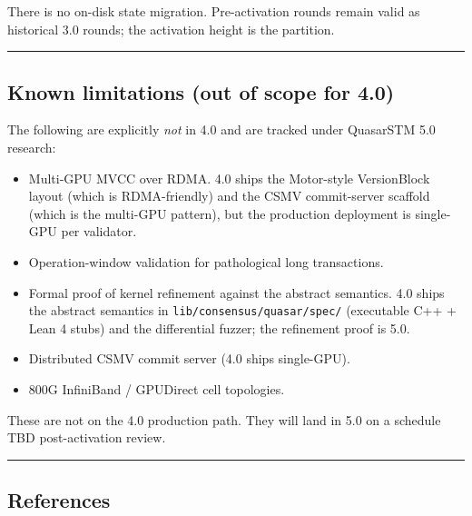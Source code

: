 \documentclass[
]{article}
\providecommand{\tightlist}{%
  \setlength{\itemsep}{0pt}\setlength{\parskip}{0pt}}
\begin{document}
There is no on-disk state migration. Pre-activation rounds remain valid
as historical 3.0 rounds; the activation height is the partition.

\begin{center}\rule{0.5\linewidth}{0.5pt}\end{center}

\subsection{Known limitations (out of scope for
4.0)}\label{known-limitations-out-of-scope-for-40}

The following are explicitly \emph{not} in 4.0 and are tracked under
QuasarSTM 5.0 research:

\begin{itemize}
\tightlist
\item
  Multi-GPU MVCC over RDMA. 4.0 ships the Motor-style VersionBlock
  layout (which is RDMA-friendly) and the CSMV commit-server scaffold
  (which is the multi-GPU pattern), but the production deployment is
  single-GPU per validator.
\item
  Operation-window validation for pathological long transactions.
\item
  Formal proof of kernel refinement against the abstract semantics. 4.0
  ships the abstract semantics in \texttt{lib/consensus/quasar/spec/}
  (executable C++ + Lean 4 stubs) and the differential fuzzer; the
  refinement proof is 5.0.
\item
  Distributed CSMV commit server (4.0 ships single-GPU).
\item
  800G InfiniBand / GPUDirect cell topologies.
\end{itemize}

These are not on the 4.0 production path. They will land in 5.0 on a
schedule TBD post-activation review.

\begin{center}\rule{0.5\linewidth}{0.5pt}\end{center}

\subsection{References}\label{references}
\end{document}

